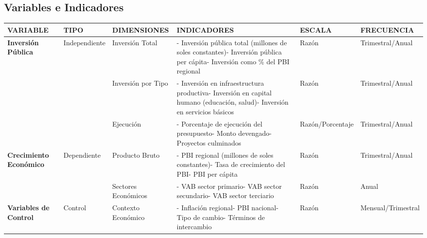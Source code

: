 \documentclass[
  man,
  floatsintext,
  longtable,
  a4paper,
  nolmodern,
  notxfonts,
  notimes,
  12pt,
  colorlinks=true,linkcolor=blue,citecolor=blue,urlcolor=blue]{apa7}
\newcounter{none} %
\begin{document}
\subsection{Variables e Indicadores}\label{variables-e-indicadores-4}

{\def\LTcaptype{none} %
\begin{longtable}[]{@{}
  >{\raggedright\arraybackslash}p{}
  >{\raggedright\arraybackslash}p{}
  >{\raggedright\arraybackslash}p{}
  >{\raggedright\arraybackslash}p{}
  >{\raggedright\arraybackslash}p{}
  >{\raggedright\arraybackslash}p{}@{}}
\toprule\noalign{}
\begin{minipage}[b]{\linewidth}\raggedright
VARIABLE
\end{minipage} & \begin{minipage}[b]{\linewidth}\raggedright
TIPO
\end{minipage} & \begin{minipage}[b]{\linewidth}\raggedright
DIMENSIONES
\end{minipage} & \begin{minipage}[b]{\linewidth}\raggedright
INDICADORES
\end{minipage} & \begin{minipage}[b]{\linewidth}\raggedright
ESCALA
\end{minipage} & \begin{minipage}[b]{\linewidth}\raggedright
FRECUENCIA
\end{minipage} \\
\midrule\noalign{}
\endhead
\bottomrule\noalign{}
\endlastfoot
\textbf{Inversión Pública} & Independiente & Inversión Total & -
Inversión pública total (millones de soles constantes)- Inversión
pública per cápita- Inversión como \% del PBI regional & Razón &
Trimestral/Anual \\
& & Inversión por Tipo & - Inversión en infraestructura productiva-
Inversión en capital humano (educación, salud)- Inversión en servicios
básicos & Razón & Trimestral/Anual \\
& & Ejecución & - Porcentaje de ejecución del presupuesto- Monto
devengado- Proyectos culminados & Razón/Porcentaje & Trimestral/Anual \\
\textbf{Crecimiento Económico} & Dependiente & Producto Bruto & - PBI
regional (millones de soles constantes)- Tasa de crecimiento del PBI-
PBI per cápita & Razón & Trimestral/Anual \\
& & Sectores Económicos & - VAB sector primario- VAB sector secundario-
VAB sector terciario & Razón & Anual \\
\textbf{Variables de Control} & Control & Contexto Económico & -
Inflación regional- PBI nacional- Tipo de cambio- Términos de
intercambio & Razón & Mensual/Trimestral \\
\end{longtable}
}
\end{document}
